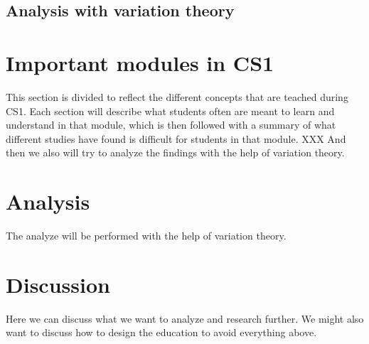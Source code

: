\documentclass[onecolumn]{article}
\begin{document}
\subsection{Analysis with variation theory}




\section{Important modules in CS1}

This section is divided to reflect the different concepts that are teached during CS1. Each section will describe what students often are meant to learn and understand in that module, which is then followed with a summary of what different studies have found is difficult for students in that module. XXX And then we also will try to analyze the findings with the help of variation theory. 









\section{Analysis}

The analyze will be performed with the help of variation theory. 

\section{Discussion}

Here we can discuss what we want to analyze and research further. We might also want to discuss how to design the education to avoid everything above.

\printbibliography
\end{document}
